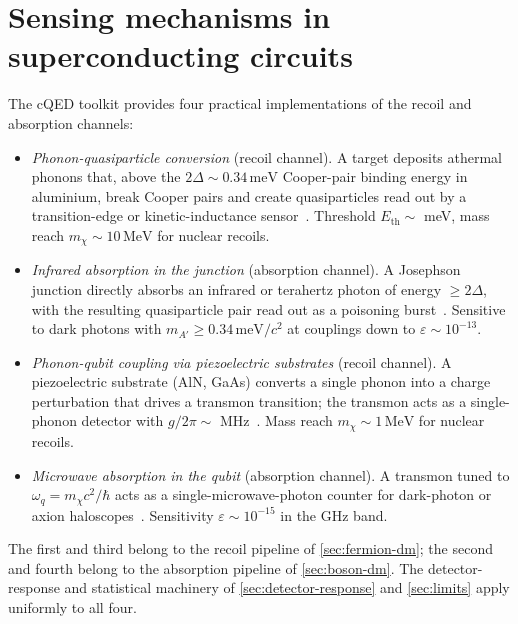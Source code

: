 \section{Sensing mechanisms in superconducting circuits}
\label{sec:cqed-mechanisms}

The cQED toolkit provides four practical implementations of the
recoil and absorption channels:

\begin{itemize}
  \item \emph{Phonon-quasiparticle conversion} (recoil channel).
  A target deposits athermal phonons that, above the
  $2\Delta\sim 0.34\,\text{meV}$ Cooper-pair binding energy in
  aluminium, break Cooper pairs and create quasiparticles read out
  by a transition-edge or kinetic-inductance
  sensor~\cite{kurinsky2020}. Threshold $E_\text{th}\sim$
  meV, mass reach $m_\chi\sim 10\,\text{MeV}$ for nuclear recoils.
  \item \emph{Infrared absorption in the junction}
  (absorption channel). A Josephson junction directly absorbs an
  infrared or terahertz photon of energy $\geq 2\Delta$, with the
  resulting quasiparticle pair read out as a poisoning
  burst~\cite{hochberg2021}. Sensitive to dark photons with
  $m_{A'}\geq 0.34\,\text{meV}/c^2$ at couplings down to
  $\varepsilon\sim 10^{-13}$.
  \item \emph{Phonon-qubit coupling via piezoelectric substrates}
  (recoil channel). A piezoelectric substrate (AlN, GaAs)
  converts a single phonon into a charge perturbation that drives
  a transmon transition; the transmon acts as a single-phonon
  detector with $g/2\pi\sim$ MHz~\cite{linehan2024}. Mass reach
  $m_\chi\sim 1\,\text{MeV}$ for nuclear recoils.
  \item \emph{Microwave absorption in the qubit} (absorption
  channel). A transmon tuned to $\omega_q=m_\chi c^2/\hbar$ acts as
  a single-microwave-photon counter for dark-photon or axion
  haloscopes~\cite{dixit2021}. Sensitivity $\varepsilon\sim 10^{-15}$
  in the GHz band.
\end{itemize}

The first and third belong to the recoil pipeline of
\cref{sec:fermion-dm}; the second and fourth belong to the
absorption pipeline of \cref{sec:boson-dm}. The detector-response
and statistical machinery of \cref{sec:detector-response} and
\cref{sec:limits} apply uniformly to all four.

